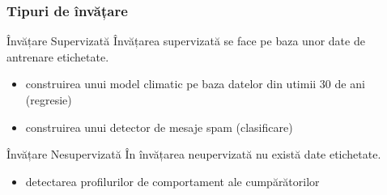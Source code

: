 \begin{frame}[t]
\begin{center}
  \end{center}
\end{frame}

\begin{frame}
  \frametitle{Tipuri de învățare}
  \begin{block}{Învățare Supervizată}
    \alert{Învățarea supervizată} se face pe baza unor date de antrenare etichetate.
    \begin{itemize}
    \item construirea unui model climatic pe baza datelor din utimii 30 de ani (regresie)
    \item construirea unui detector de mesaje spam (clasificare)
    \end{itemize}
  \end{block}\pause
  \begin{block}{Învățare Nesupervizată}
    În \alert{învățarea neupervizată} nu există date etichetate.
    \begin{itemize}
    \item detectarea profilurilor de comportament ale cumpărătorilor
    \end{itemize}
  \end{block}
\end{frame}